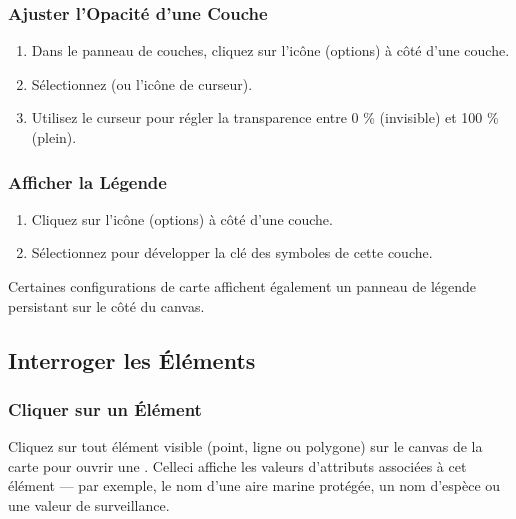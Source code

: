 \documentclass[letterpaper,10pt,english]{sphinxmanual}
\begin{document}
\subsubsection{Ajuster l’Opacité d’une Couche}
\label{\detokenize{fr/04_explorer_cartes:ajuster-l-opacite-d-une-couche}}\begin{enumerate}
%
\item {} 
\sphinxAtStartPar
Dans le panneau de couches, cliquez sur l’icône  (options) à côté d’une couche.

\item {} 
\sphinxAtStartPar
Sélectionnez  (ou l’icône de curseur).

\item {} 
\sphinxAtStartPar
Utilisez le curseur  pour régler la transparence entre 0 \% (invisible)
et 100 \% (plein).

\end{enumerate}


\subsubsection{Afficher la Légende}
\label{\detokenize{fr/04_explorer_cartes:afficher-la-legende}}\begin{enumerate}
%
\item {} 
\sphinxAtStartPar
Cliquez sur l’icône  (options) à côté d’une couche.

\item {} 
\sphinxAtStartPar
Sélectionnez  pour développer la clé des symboles de cette couche.

\end{enumerate}

\sphinxAtStartPar
Certaines configurations de carte affichent également un panneau de légende persistant
sur le côté du canvas.


\subsection{Interroger les Éléments}
\label{\detokenize{fr/04_explorer_cartes:interroger-les-elements}}

\subsubsection{Cliquer sur un Élément}
\label{\detokenize{fr/04_explorer_cartes:cliquer-sur-un-element}}
\sphinxAtStartPar
Cliquez sur tout élément visible (point, ligne ou polygone) sur le canvas de la carte
pour ouvrir une . Celle\sphinxhyphen{}ci affiche les valeurs
d’attributs associées à cet élément — par exemple, le nom d’une aire marine protégée,
un nom d’espèce ou une valeur de surveillance.
\end{document}
